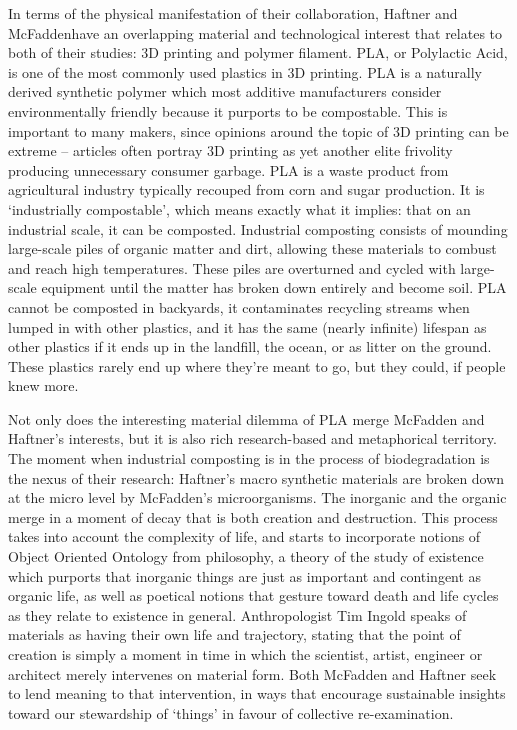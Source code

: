 In terms of the physical manifestation of their collaboration, Haftner and McFaddenhave an overlapping material and technological interest that relates to both of their studies: 3D printing and polymer filament. PLA, or Polylactic Acid, is one of the most commonly used plastics in 3D printing. PLA is a naturally derived synthetic polymer which most additive manufacturers consider environmentally friendly because it purports to be compostable. This is important to many makers, since opinions around the topic of 3D printing can be extreme – articles often portray 3D printing as yet another elite frivolity producing unnecessary consumer garbage. PLA is a waste product from agricultural industry typically recouped from corn and sugar production. It is ‘industrially compostable’, which means exactly what it implies: that on an industrial scale, it can be composted. Industrial composting consists of mounding large-scale piles of organic matter and dirt, allowing these materials to combust and reach high temperatures. These piles are overturned and cycled with large-scale equipment until the matter has broken down entirely and become soil. PLA cannot be composted in backyards, it contaminates recycling streams when lumped in with other plastics, and it has the same (nearly infinite) lifespan as other plastics if it ends up in the landfill, the ocean, or as litter on the ground. These plastics rarely end up where they’re meant to go, but they could, if people knew more.

Not only does the interesting material dilemma of PLA merge McFadden and Haftner’s interests, but it is also rich research-based and metaphorical territory. The moment when industrial composting is in the process of biodegradation is the nexus of their research: Haftner’s macro synthetic materials are broken down at the micro level by McFadden’s microorganisms. The inorganic and the organic merge in a moment of decay that is both creation and destruction. This process takes into account the complexity of life, and starts to incorporate notions of Object Oriented Ontology from philosophy, a theory of the study of existence which purports that inorganic things are just as important and contingent as organic life, as well as poetical notions that gesture toward death and life cycles as they relate to existence in general. Anthropologist Tim Ingold speaks of materials as having their own life and trajectory, stating that the point of creation is simply a moment in time in which the scientist, artist, engineer or architect merely intervenes on material form. Both McFadden and Haftner seek to lend meaning to that intervention, in ways that encourage sustainable insights toward our stewardship of ‘things’ in favour of collective re-examination.

